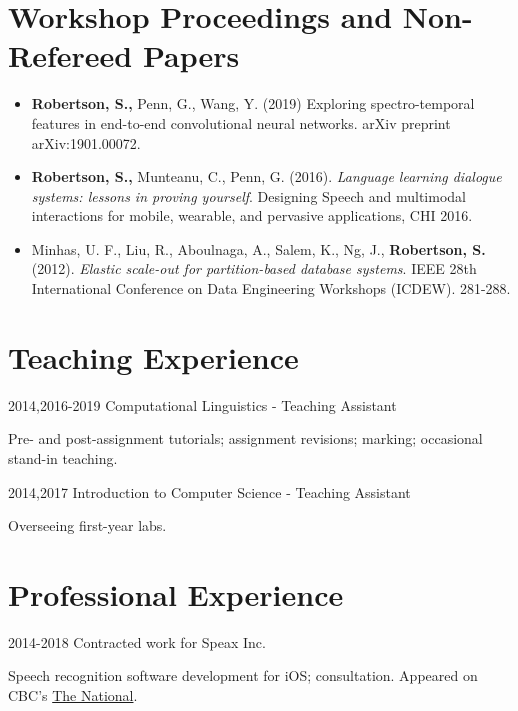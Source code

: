\documentclass{article}
\begin{document}
\section{Workshop Proceedings and Non-Refereed Papers}
\begin{itemize}
  \item \textbf{Robertson, S.,} Penn, G., Wang, Y. (2019) Exploring
    spectro-temporal features in end-to-end convolutional neural networks.
    arXiv preprint arXiv:1901.00072.

  \item \textbf{Robertson, S.,} Munteanu, C., Penn, G. (2016).
    \textit{Language learning dialogue systems: lessons in proving yourself}.
    Designing Speech and multimodal interactions for mobile, wearable, and
    pervasive applications, CHI 2016.

  \item Minhas, U. F., Liu, R., Aboulnaga, A., Salem, K., Ng, J.,
    \textbf{Robertson, S.} (2012). \textit{Elastic scale-out for
    partition-based database systems}. IEEE 28th International Conference on
    Data Engineering Workshops (ICDEW). 281-288.

\end{itemize}


\section{Teaching Experience}
\begin{CV}

  \item[2014,2016-2019] Computational Linguistics - Teaching Assistant

    Pre- and post-assignment tutorials; assignment revisions; marking;
    occasional stand-in teaching.

  \item[2014,2017] Introduction to Computer Science - Teaching Assistant

    Overseeing first-year labs.

\end{CV}

\section{Professional Experience}

\begin{CV}
  \item[2014-2018] Contracted work for Speax Inc.

    Speech recognition software development for iOS; consultation. Appeared on
    CBC's \href{https://www.cbc.ca/player/play/1418433091867/}{The National}.

\end{CV}
\end{document}
